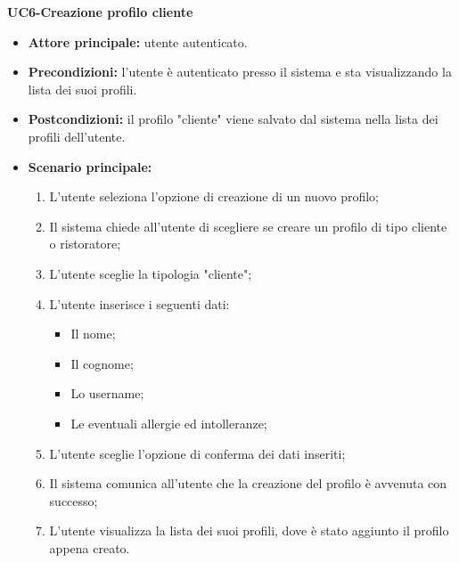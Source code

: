 \textbf{UC6-Creazione profilo cliente}
\begin{itemize}
    \item \textbf{Attore principale:} utente autenticato.
    \item \textbf{Precondizioni:} l'utente è autenticato presso il sistema e sta visualizzando
    la lista dei suoi profili.
    \item \textbf{Postcondizioni:} il profilo "cliente" viene salvato dal sistema nella lista dei profili
    dell'utente.
    \item \textbf{Scenario principale:}
    \begin{enumerate}
        \item L'utente seleziona l'opzione di creazione di un nuovo profilo;
        \item Il sistema chiede all'utente di scegliere se creare un profilo di tipo cliente
        o ristoratore;
        \item L'utente sceglie la tipologia "cliente";
        \item L'utente inserisce i seguenti dati:
        \begin{itemize}
            \item Il nome;
            \item Il cognome;
            \item Lo username;
            \item Le eventuali allergie ed intolleranze;
        \end{itemize}
        \item L'utente sceglie l'opzione di conferma dei dati inseriti;
        \item Il sistema comunica all'utente che la creazione del profilo è avvenuta con successo;
        \item L'utente visualizza la lista dei suoi profili, dove è stato aggiunto il profilo appena creato.
    \end{enumerate}
\end{itemize}

